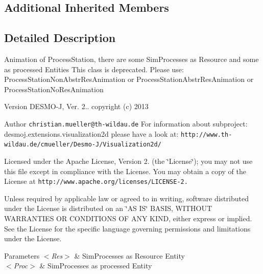 \subsection*{Additional Inherited Members}


\subsection{Detailed Description}
Animation of Process\-Station, there are some Sim\-Processes as Resource and some as processed Entities This class is deprecated. Please use\-: Process\-Station\-Non\-Abstr\-Res\-Animation or Process\-Station\-Abstr\-Res\-Animation or Process\-Station\-No\-Res\-Animation

\begin{DoxyVersion}{Version}
D\-E\-S\-M\-O-\/\-J, Ver. 2.. copyright (c) 2013 
\end{DoxyVersion}
\begin{DoxyAuthor}{Author}
{\tt christian.\-mueller@th-\/wildau.\-de} For information about subproject\-: desmoj.\-extensions.\-visualization2d please have a look at\-: {\tt http\-://www.\-th-\/wildau.\-de/cmueller/\-Desmo-\/\-J/\-Visualization2d/}
\end{DoxyAuthor}
Licensed under the Apache License, Version 2. (the \char`\"{}\-License\char`\"{}); you may not use this file except in compliance with the License. You may obtain a copy of the License at {\tt http\-://www.\-apache.\-org/licenses/\-L\-I\-C\-E\-N\-S\-E-\/2.}

Unless required by applicable law or agreed to in writing, software distributed under the License is distributed on an \char`\"{}\-A\-S I\-S\char`\"{} B\-A\-S\-I\-S, W\-I\-T\-H\-O\-U\-T W\-A\-R\-R\-A\-N\-T\-I\-E\-S O\-R C\-O\-N\-D\-I\-T\-I\-O\-N\-S O\-F A\-N\-Y K\-I\-N\-D, either express or implied. See the License for the specific language governing permissions and limitations under the License.


\begin{DoxyParams}{Parameters}
{\em $<$\-Res$>$} & Sim\-Processes as Resource Entity \\
\hline
{\em $<$\-Proc$>$} & Sim\-Processes as processed Entity \\
\hline
\end{DoxyParams}


